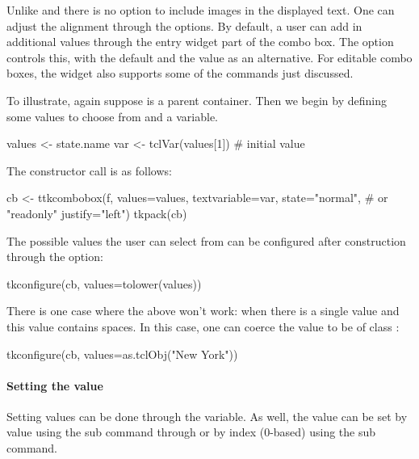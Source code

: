 Unlike \GTK{} and \Qt{} there is no option to include images in the
displayed text. One can adjust the alignment through the
 options.  By default, a user can add in
additional values through the entry widget part of the combo box. The
 option controls this, with the default
 and the value  as an alternative. For
editable combo boxes, the widget also supports some of the
 commands just discussed.


To illustrate, again suppose  is a parent container. Then we
begin by defining some values to choose from and a \TCL\/ variable.


\begin{Schunk}
\begin{Sinput}
 values <- state.name
 var <- tclVar(values[1])              # initial value
\end{Sinput}
\end{Schunk}

The constructor call is as follows:
\begin{Schunk}
\begin{Sinput}
 cb <- ttkcombobox(f,
                   values=values,
                   textvariable=var,
                   state="normal",     # or "readonly"
                   justify="left")
 tkpack(cb)
\end{Sinput}
\end{Schunk}


The possible values the user can select from can be configured after
construction through the  option:
\begin{Schunk}
\begin{Sinput}
 tkconfigure(cb, values=tolower(values))
\end{Sinput}
\end{Schunk}

There is one case where the above won't work: when there is a single
value and this value contains spaces. In this case, one can coerce the
value to be of class :
\begin{Schunk}
\begin{Sinput}
 tkconfigure(cb, values=as.tclObj("New York"))
\end{Sinput}
\end{Schunk}

\paragraph{Setting the value}
Setting values can be done through the \TCL\/ variable. As well, the
value can be set by value using the  sub
command through  or by index (0-based) using the
 sub command.


